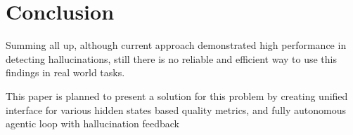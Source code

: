 \documentclass[11pt,a4paper]{article}
\begin{document}

\section{Conclusion}

Summing all up, although current approach demonstrated high performance 
in detecting hallucinations, still there is no reliable and efficient way
to use this findings in real world tasks.

This paper is planned to present a solution for this problem by creating
unified interface for various hidden states based quality metrics, and
fully autonomous agentic loop with hallucination feedback




\end{document}
